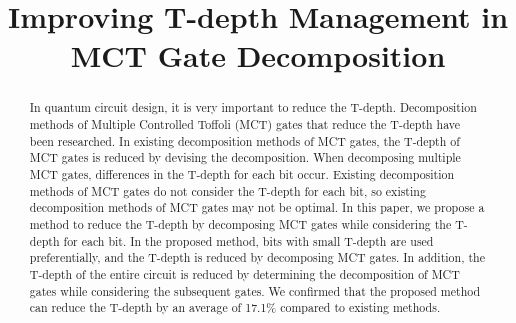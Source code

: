 \documentclass[conference]{IEEEtran}
\begin{document}
\title{Improving T-depth Management in MCT Gate Decomposition}
\author{
  \and
  \and
}

\maketitle

\begin{abstract}

  In quantum circuit design, it is very important to reduce the T-depth. Decomposition
  methods of Multiple Controlled Toffoli (MCT) gates that reduce the T-depth have been
  researched. In existing decomposition methods of MCT gates, the T-depth of MCT gates
  is reduced by devising the decomposition. When decomposing multiple MCT gates,
  differences in the T-depth for each bit occur. Existing decomposition methods of MCT
  gates do not consider the T-depth for each bit, so existing decomposition methods of
  MCT gates may not be optimal. In this paper, we propose a method to reduce the T-depth
  by decomposing MCT gates while considering the T-depth for each bit. In the proposed
  method, bits with small T-depth are used preferentially, and the T-depth is reduced
  by decomposing MCT gates. In addition, the T-depth of the entire circuit is reduced
  by determining the decomposition of MCT gates while considering the subsequent gates.
  We confirmed that the proposed method can reduce the T-depth by an average of 17.1\%
  compared to existing methods. 
\end{abstract}
\end{document}
